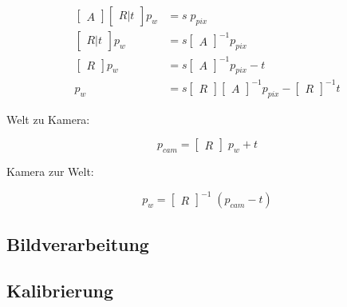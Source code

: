 		\begin{equation}
			\begin{aligned}
				 \begin{bmatrix} A \end{bmatrix} \begin{bmatrix} R|t \end{bmatrix} p_w &= s \; p_{pix} \\
				 \begin{bmatrix} R|t \end{bmatrix} p_w &= s \begin{bmatrix} A \end{bmatrix}^{-1} p_{pix} \\
				 \begin{bmatrix} R \end{bmatrix} p_w &= s \begin{bmatrix} A \end{bmatrix}^{-1} p_{pix} - t \\
				 p_w &= s \begin{bmatrix} R \end{bmatrix} \begin{bmatrix} A \end{bmatrix}^{-1} p_{pix} - \begin{bmatrix} R \end{bmatrix}^{-1} t
			\end{aligned}
		\end{equation}
		
		Welt zu Kamera:
		
		\begin{equation}
			p_{cam} = \begin{bmatrix} R \end{bmatrix} \; p_w + t
		\end{equation}
		
		Kamera zur Welt:
		
		\begin{equation}
			p_w = \begin{bmatrix} R \end{bmatrix}^{-1} \; (p_{cam} - t)
		\end{equation}
		
	\subsection{Bildverarbeitung}
	
	\subsection{Kalibrierung}
